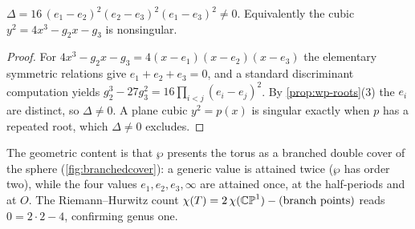 \begin{corollary}
\label{cor:wp-smooth}
\(\Delta = 16\,(e_1 - e_2)^2 (e_2 - e_3)^2 (e_1 - e_3)^2 \ne 0\). Equivalently the
cubic \(y^2 = 4x^3 - g_2 x - g_3\) is nonsingular.
\end{corollary}

\begin{proof}
For \(4x^3 - g_2 x - g_3 = 4(x-e_1)(x-e_2)(x-e_3)\) the elementary symmetric
relations give \(e_1+e_2+e_3 = 0\), and a standard discriminant computation yields
\(g_2^3 - 27 g_3^2 = 16 \prod_{i<j}(e_i - e_j)^2\). By \cref{prop:wp-roots}(3) the
\(e_i\) are distinct, so \(\Delta \ne 0\). A plane cubic \(y^2 = p(x)\) is singular
exactly when \(p\) has a repeated root, which \(\Delta \ne 0\) excludes.
\end{proof}

The geometric content is that \(\wp\) presents the torus as a branched double
cover of the sphere (\cref{fig:branchedcover}): a generic value is attained twice
(\(\wp\) has order two), while the four values \(e_1, e_2, e_3, \infty\) are
attained once, at the half-periods and at \(O\). The Riemann--Hurwitz count
\(\chi(T) = 2\,\chi(\mathbb{CP}^1) - (\text{branch points})\) reads
\(0 = 2 \cdot 2 - 4\), confirming genus one.

